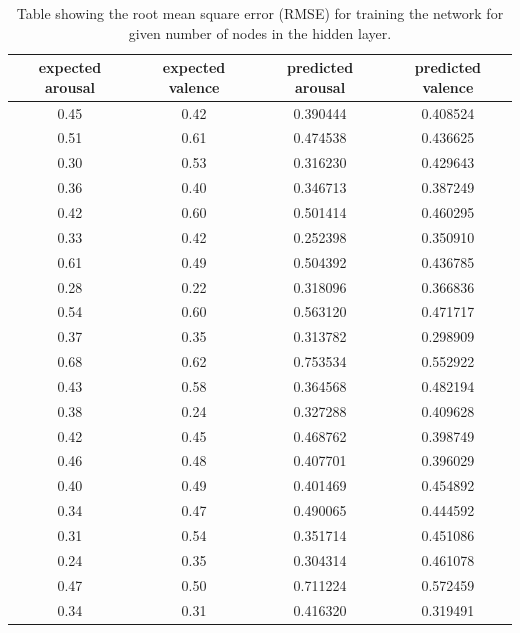 \begin{table}[t]
\begin{center}
\begin{tabular}{| c | c | c | c | } \hline 
 expected arousal & expected valence & predicted arousal & predicted valence \\ \hline \hline

0.45  & 	0.42  &  0.390444 &  0.408524  \\ \hline
0.51	&  0.61  &  0.474538 & 0.436625   \\ \hline
0.30  &  0.53  &  0.316230 & 0.429643   \\ \hline
0.36	&  0.40  &  0.346713 & 0.387249   \\ \hline
0.42	&  0.60  &  0.501414 & 0.460295   \\ \hline
0.33	&  0.42  &  0.252398 & 0.350910   \\ \hline
0.61	&  0.49  &  0.504392 & 0.436785   \\ \hline
0.28	&  0.22  &  0.318096 & 0.366836   \\ \hline
0.54	&  0.60  &  0.563120 & 0.471717   \\ \hline
0.37	&  0.35  &  0.313782 & 0.298909   \\ \hline
0.68  &  0.62  &  0.753534 & 0.552922   \\ \hline
0.43	&  0.58  &  0.364568 & 0.482194   \\ \hline
0.38	&  0.24  &  0.327288 & 0.409628   \\ \hline
0.42  &  0.45  &  0.468762 & 0.398749   \\ \hline
0.46  &  0.48  &  0.407701 & 0.396029   \\ \hline
0.40  &  0.49  &  0.401469 & 0.454892   \\ \hline
0.34  &  0.47  &  0.490065 & 0.444592   \\ \hline
0.31  &  0.54  &  0.351714 & 0.451086   \\ \hline
0.24  &  0.35  &  0.304314 & 0.461078   \\ \hline
0.47	&  0.50  &  0.711224 & 0.572459   \\ \hline
0.34	&  0.31  &  0.416320 & 0.319491   \\ \hline
\end{tabular}
\caption{Table showing the root mean square error (RMSE) for training the network for given number of nodes in the hidden layer.}
\label{table:rsmetablefinal}
\end{center}
\end{table}


